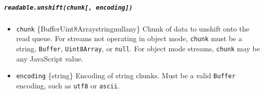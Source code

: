 \begin{Shaded}
\begin{Highlighting}[]
\OperatorTok{=} \NormalTok{(}\NormalTok{)}\OperatorTok{;}
\OperatorTok{=} \NormalTok{()}\OperatorTok{;}
\OperatorTok{=}\NormalTok{(}\NormalTok{)}\OperatorTok{;}
\OperatorTok{;}
\NormalTok{(() }\KeywordTok{=\textgreater{}}\NormalTok{ \{}
  \NormalTok{(}\NormalTok{)}\OperatorTok{;}
\OperatorTok{;}
  \NormalTok{(}\NormalTok{)}\OperatorTok{;}
\NormalTok{()}\OperatorTok{;}
\NormalTok{\}}\OperatorTok{,} \NormalTok{)}\OperatorTok{;}
\end{Highlighting}
\end{Shaded}

\subparagraph{\texorpdfstring{\texttt{readable.unshift(chunk{[},\ encoding{]})}}{readable.unshift(chunk{[}, encoding{]})}}\label{readable.unshiftchunk-encoding}

\begin{itemize}
\tightlist
\item
  \texttt{chunk}
  \{Buffer\textbar Uint8Array\textbar string\textbar null\textbar any\}
  Chunk of data to unshift onto the read queue. For streams not
  operating in object mode, \texttt{chunk} must be a string,
  \texttt{Buffer}, \texttt{Uint8Array}, or \texttt{null}. For object
  mode streams, \texttt{chunk} may be any JavaScript value.
\item
  \texttt{encoding} \{string\} Encoding of string chunks. Must be a
  valid \texttt{Buffer} encoding, such as
  \texttt{\textquotesingle{}utf8\textquotesingle{}} or
  \texttt{\textquotesingle{}ascii\textquotesingle{}}.
\end{itemize}

